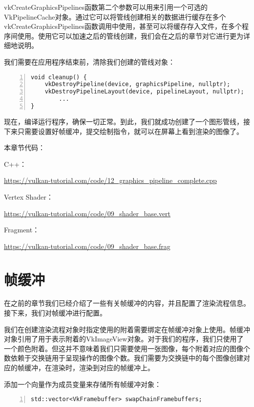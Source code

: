 \documentclass{ctexart}
\begin{document}
vkCreateGraphicsPipelines函数第二个参数可以用来引用一个可选的VkPipelineCache对象。通过它可以将管线创建相关的数据进行缓存在多个vkCreateGraphicsPipelines函数调用中使用，甚至可以将缓存存入文件，在多个程序间使用。使用它可以加速之后的管线创建，我们会在之后的章节对它进行更为详细地说明。

我们需要在应用程序结束前，清除我们创建的管线对象：

\begin{lstlisting}[language={[ANSI]C},keywordstyle=\color{blue!70},commentstyle=\color{red!50!green!50!blue!50},frame=shadowbox, rulesepcolor=\color{red!20!green!20!blue!20},basicstyle=\small,numbers=left, numberstyle=\tiny,breaklines=true]
void cleanup() {
	vkDestroyPipeline(device, graphicsPipeline, nullptr);
	vkDestroyPipelineLayout(device, pipelineLayout, nullptr);
		...
}
\end{lstlisting}

现在，编译运行程序，确保一切正常。到此，我们就成功创建了一个图形管线，接下来只需要设置好帧缓冲，提交绘制指令，就可以在屏幕上看到渲染的图像了。

本章节代码：

C++：

\url{https://vulkan-tutorial.com/code/12_graphics_pipeline_complete.cpp}

Vertex Shader：

\url{https://vulkan-tutorial.com/code/09_shader_base.vert}

Fragment：

\url{https://vulkan-tutorial.com/code/09_shader_base.frag}

\newpage
\section{帧缓冲}

在之前的章节我们已经介绍了一些有关帧缓冲的内容，并且配置了渲染流程信息。接下来，我们对帧缓冲进行配置。

我们在创建渲染流程对象时指定使用的附着需要绑定在帧缓冲对象上使用。帧缓冲对象引用了用于表示附着的VkImageView对象。对于我们的程序，我们只使用了一个颜色附着。但这并不意味着我们只需要使用一张图像，每个附着对应的图像个数依赖于交换链用于呈现操作的图像个数。我们需要为交换链中的每个图像创建对应的帧缓冲，在渲染时，渲染到对应的帧缓冲上。

添加一个向量作为成员变量来存储所有帧缓冲对象：

\begin{lstlisting}[language={[ANSI]C},keywordstyle=\color{blue!70},commentstyle=\color{red!50!green!50!blue!50},frame=shadowbox, rulesepcolor=\color{red!20!green!20!blue!20},basicstyle=\small,numbers=left, numberstyle=\tiny,breaklines=true]
std::vector<VkFramebuffer> swapChainFramebuffers;
\end{lstlisting}
\end{document}
